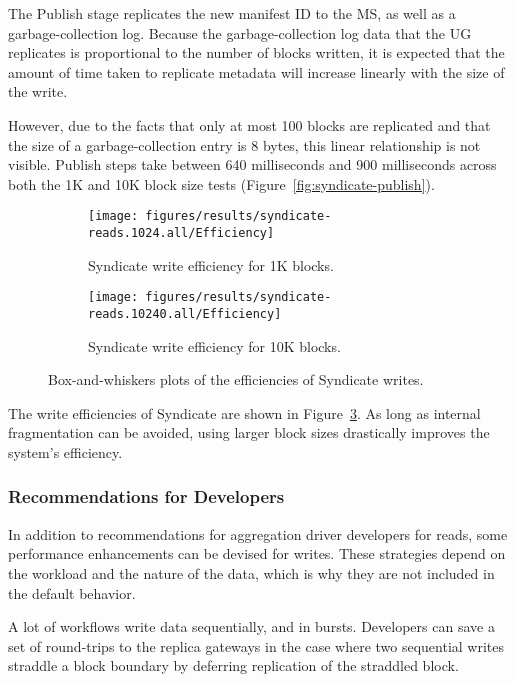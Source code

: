 The Publish stage replicates the new manifest ID to the MS, as well as a
garbage-collection log.  Because the garbage-collection log data that the UG
replicates is proportional to the number of blocks written, it is expected that
the amount of time taken to replicate metadata will increase linearly with the
size of the write.

However, due to the facts that only at most 100 blocks are replicated and that
the size of a garbage-collection entry is 8 bytes, this linear relationship is
not visible.  Publish steps take between 640 milliseconds and 900 milliseconds
across both the 1K and 10K block size tests
(Figure~\ref{fig:syndicate-publish}).

\begin{figure}[htp!]
   \centering
   \begin{subfigure}[b]{.8\textwidth}
      \texttt{[image: figures/results/syndicate-reads.1024.all/Efficiency]}
      \label{fig:syndicate-efficiency-1k}
      \caption{Syndicate write efficiency for 1K blocks.}
   \end{subfigure}
   \begin{subfigure}[b]{.8\textwidth}
      \texttt{[image: figures/results/syndicate-reads.10240.all/Efficiency]}
      \label{fig:syndicate-efficiency-1k}
      \caption{Syndicate write efficiency for 10K blocks.}
   \end{subfigure}
   \caption{Box-and-whiskers plots of the efficiencies of Syndicate
   writes.}
   \label{fig:syndicate-write-efficiency}
\end{figure}

The write efficiencies of Syndicate are shown in
Figure~\ref{fig:syndicate-write-efficiency}.  As long as internal fragmentation
can be avoided, using larger block sizes drastically improves the system's
efficiency.

\subsubsection{Recommendations for Developers}

In addition to recommendations for aggregation driver developers for reads, some
performance enhancements can be devised for writes.  These strategies depend on
the workload and the nature of the data, which is why they are not included in
the default behavior.

\hfill \break
{}
\hfill \break

A lot of workflows write data sequentially, and in bursts.
Developers can save a set of round-trips to the replica gateways
in the case where two sequential writes straddle a block boundary
by deferring replication of the straddled block.

